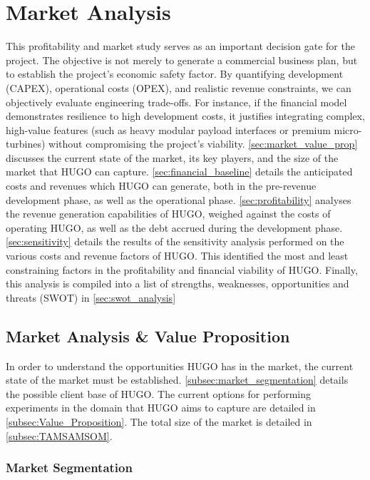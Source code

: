 \chapter{Market Analysis}
\label{ch:market_anaysis}
This profitability and market study serves as an important decision gate for the project. The objective is not merely to generate a commercial business plan, but to establish the project's economic safety factor. By quantifying development (CAPEX), operational costs (OPEX), and realistic revenue constraints, we can objectively evaluate engineering trade-offs. For instance, if the financial model demonstrates resilience to high development costs, it justifies integrating complex, high-value features (such as heavy modular payload interfaces or premium micro-turbines) without compromising the project's viability. \autoref{sec:market_value_prop} discusses the current state of the market, its key players, and the size of the market that HUGO can capture. \autoref{sec:financial_baseline} details the anticipated costs and revenues which HUGO can generate, both in the pre-revenue development phase, as well as the operational phase. \autoref{sec:profitability} analyses the revenue generation capabilities of HUGO, weighed against the costs of operating HUGO, as well as the debt accrued during the development phase. \autoref{sec:sensitivity} details the results of the sensitivity analysis performed on the various costs and revenue factors of HUGO. This identified the most and least constraining factors in the profitability and financial viability of HUGO. Finally, this analysis is compiled into a list of strengths, weaknesses, opportunities and threats (SWOT) in \autoref{sec:swot_analysis}

\section{Market Analysis \& Value Proposition}
\label{sec:market_value_prop}

In order to understand the opportunities HUGO has in the market, the current state of the market must be established. \autoref{subsec:market_segmentation} details the possible client base of HUGO. The current options for performing experiments in the domain that HUGO aims to capture are detailed in \autoref{subsec:Value_Proposition}. The total size of the market is detailed in \autoref{subsec:TAMSAMSOM}.

\subsection{Market Segmentation}
\label{subsec:market_segmentation}

